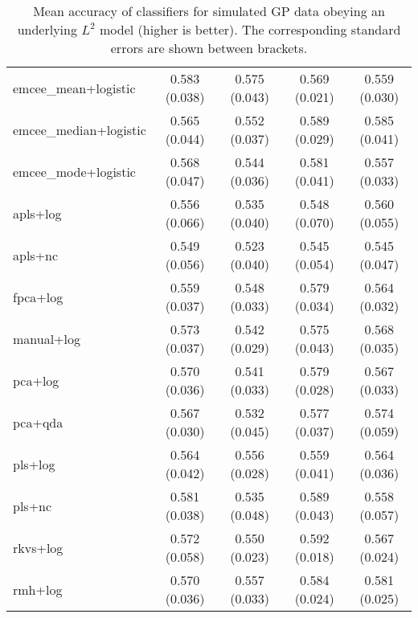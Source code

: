 \begin{table}[p]
\begin{tabular}{lcccc}
\bottomrule
\toprule
  emcee\_mean+logistic & 0.583 (0.038) & 0.575 (0.043) & 0.569 (0.021) & 0.559 (0.030) \\
emcee\_median+logistic & 0.565 (0.044) & 0.552 (0.037) & 0.589 (0.029) & 0.585 (0.041) \\
  emcee\_mode+logistic & 0.568 (0.047) & 0.544 (0.036) & 0.581 (0.041) & 0.557 (0.033) \\
             apls+log & 0.556 (0.066) & 0.535 (0.040) & 0.548 (0.070) & 0.560 (0.055) \\
              apls+nc & 0.549 (0.056) & 0.523 (0.040) & 0.545 (0.054) & 0.545 (0.047) \\
             fpca+log & 0.559 (0.037) & 0.548 (0.033) & 0.579 (0.034) & 0.564 (0.032) \\
           manual+log & 0.573 (0.037) & 0.542 (0.029) & 0.575 (0.043) & 0.568 (0.035) \\
              pca+log & 0.570 (0.036) & 0.541 (0.033) & 0.579 (0.028) & 0.567 (0.033) \\
              pca+qda & 0.567 (0.030) & 0.532 (0.045) & 0.577 (0.037) & 0.574 (0.059) \\
              pls+log & 0.564 (0.042) & 0.556 (0.028) & 0.559 (0.041) & 0.564 (0.036) \\
               pls+nc & 0.581 (0.038) & 0.535 (0.048) & 0.589 (0.043) & 0.558 (0.057) \\
             rkvs+log & 0.572 (0.058) & 0.550 (0.023) & 0.592 (0.018) & 0.567 (0.024) \\
              rmh+log & 0.570 (0.036) & 0.557 (0.033) & 0.584 (0.024) & 0.581 (0.025) \\
\bottomrule
\end{tabular}
  \caption{Mean accuracy of classifiers for simulated GP data obeying an underlying \(L^2\) model (higher is better). The corresponding standard errors are shown between brackets.}
\end{table}

\newpage

